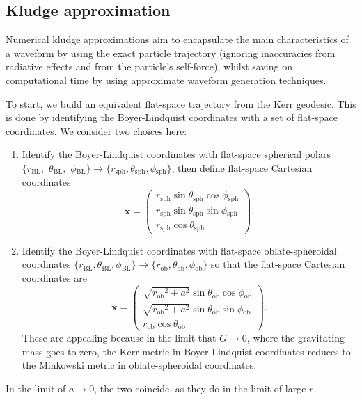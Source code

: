 \documentclass[useAMS,usedcolumn,usegraphicx,usenatbib]{mn2e}
\newcommand{\sub}[1]{\ensuremath{_\mathrm{#1}}}
\begin{document}
\subsection{Kludge approximation}

Numerical kludge approximations aim to encapsulate the main characteristics of a waveform by using the exact particle trajectory (ignoring inaccuracies from radiative effects and from the particle's self-force), whilst saving on computational time by using approximate waveform generation techniques.

To start, we build an equivalent flat-space trajectory from the Kerr geodesic. This is done by identifying the Boyer-Lindquist coordinates with a set of flat-space coordinates. We consider two choices here:
\begin{enumerate}
\item Identify the Boyer-Lindquist coordinates with flat-space spherical polars $\{r\sub{BL},$ $\theta\sub{BL},$ $\phi\sub{BL}\} \rightarrow \{r\sub{sph}, \theta\sub{sph}, \phi\sub{sph}\}$, then define flat-space Cartesian coordinates \citep{Gair2005, Babak2007}
\begin{equation}
\boldsymbol{x} = \begin{pmatrix}
r\sub{sph} \sin\theta\sub{sph}\cos\phi\sub{sph} \\
r\sub{sph} \sin\theta\sub{sph}\sin\phi\sub{sph} \\
r\sub{sph} \cos\theta\sub{sph}
\end{pmatrix}.
\end{equation}
\item Identify the Boyer-Lindquist coordinates with flat-space oblate-spheroidal coordinates $\{r\sub{BL}, \theta\sub{BL}, \phi\sub{BL}\} \rightarrow \{r\sub{ob}, \theta\sub{ob}, \phi\sub{ob}\}$ so that the flat-space Cartesian coordinates are
\begin{equation}
\boldsymbol{x} = \begin{pmatrix}
\sqrt{{r\sub{ob}}^2 + a^2} \sin\theta\sub{ob}\cos\phi\sub{ob} \\
\sqrt{{r\sub{ob}}^2 + a^2} \sin\theta\sub{ob}\sin\phi\sub{ob} \\
r\sub{ob} \cos\theta\sub{ob}
\end{pmatrix}.
\end{equation}
These are appealing because in the limit that $G \rightarrow 0$, where the gravitating mass goes to zero, the Kerr metric in Boyer-Lindquist coordinates reduces to the Minkowski metric in oblate-spheroidal coordinates.
\end{enumerate}
In the limit of $a \rightarrow 0$, the two coincide, as they do in the limit of large $r$.
\end{document}
